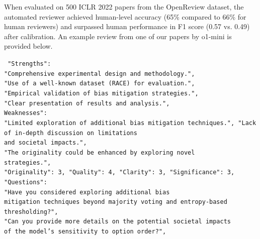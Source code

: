 \documentclass[11pt, a4paper]{gdm_format}
\newcommand{\blank}[1]{\hspace*{#1}\linebreak[0]}
\begin{document}
\begin{enumerate}
    When evaluated on 500 ICLR 2022 papers from the OpenReview dataset, the automated reviewer achieved human-level accuracy (65\% compared to 66\% for human reviewers) and surpassed human performance in F1 score (0.57 vs. 0.49) after calibration. 
    An example review from one of our papers by o1-mini is provided below.
\end{enumerate}

\begin{tcolorbox}[breakable,colback=blue!5!white, colframe=blue!70!black, title=Example Review ( o1-mini | Word Order Sensitivity )]
\texttt{
 "Strengths": \text{[}\\
	\blank{1cm} "Comprehensive experimental design and methodology.",\\
	\blank{1cm} "Use of a well-known dataset (RACE) for evaluation.",\\
	\blank{1cm} "Empirical validation of bias mitigation strategies.",\\
	\blank{1cm} "Clear presentation of results and analysis."\text{]},\\
Weaknesses": \text{[}\\
	\blank{1cm} "Limited exploration of additional bias mitigation techniques.",
	\blank{1cm} "Lack of in-depth discussion on limitations \\\blank{1cm} and societal impacts.",\\
	\blank{1cm} "The originality could be enhanced by exploring novel \\\blank{1cm} strategies."\text{]},\\
"Originality": 3, "Quality": 4, "Clarity": 3, "Significance": 3,\\
"Questions": \text{[}\\
	\blank{1cm} "Have you considered exploring additional bias \\\blank{1cm} mitigation techniques beyond majority voting and entropy-based \\\blank{1cm} thresholding?",\\
	\blank{1cm} "Can you provide more details on the potential societal impacts\\\blank{1cm}  of the model's sensitivity to option order?",\\
}
\end{tcolorbox}
\end{document}
